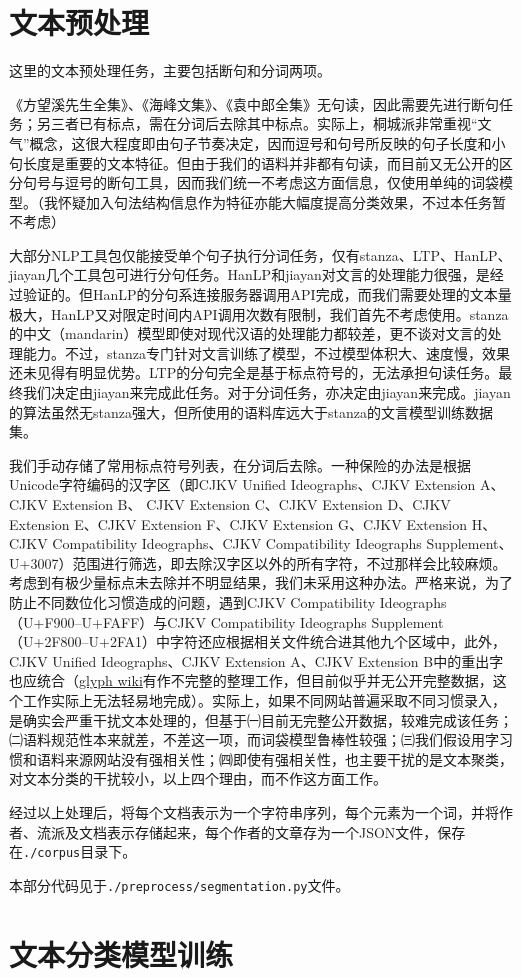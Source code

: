 \documentclass[12pt, a4paper, oneside]{ctexart}
\begin{document}
\section{文本预处理}

这里的文本预处理任务，主要包括断句和分词两项。

《方望溪先生全集》、《海峰文集》、《袁中郎全集》无句读，因此需要先进行断句任务；另三者已有标点，需在分词后去除其中标点。实际上，桐城派非常重视“文气”概念，这很大程度即由句子节奏决定，因而逗号和句号所反映的句子长度和小句长度是重要的文本特征。但由于我们的语料并非都有句读，而目前又无公开的区分句号与逗号的断句工具，因而我们统一不考虑这方面信息，仅使用单纯的词袋模型。（我怀疑加入句法结构信息作为特征亦能大幅度提高分类效果，不过本任务暂不考虑）

大部分NLP工具包仅能接受单个句子执行分词任务，仅有stanza、LTP、HanLP、jiayan几个工具包可进行分句任务。HanLP和jiayan对文言的处理能力很强，是经过验证的。但HanLP的分句系连接服务器调用API完成，而我们需要处理的文本量极大，HanLP又对限定时间内API调用次数有限制，我们首先不考虑使用。stanza的中文（mandarin）模型即使对现代汉语的处理能力都较差，更不谈对文言的处理能力。不过，stanza专门针对文言训练了模型，不过模型体积大、速度慢，效果还未见得有明显优势。LTP的分句完全是基于标点符号的，无法承担句读任务。最终我们决定由jiayan来完成此任务。对于分词任务，亦决定由jiayan来完成。jiayan的算法虽然无stanza强大，但所使用的语料库远大于stanza的文言模型训练数据集。

我们手动存储了常用标点符号列表，在分词后去除。一种保险的办法是根据Unicode字符编码的汉字区（即CJKV Unified Ideographs、CJKV Extension A、CJKV Extension B、
CJKV Extension C、CJKV Extension D、CJKV Extension E、CJKV Extension F、CJKV Extension G、CJKV Extension H、CJKV Compatibility Ideographs、CJKV Compatibility Ideographs Supplement、U+3007）范围进行筛选，即去除汉字区以外的所有字符，不过那样会比较麻烦。考虑到有极少量标点未去除并不明显结果，我们未采用这种办法。严格来说，为了防止不同数位化习惯造成的问题，遇到CJKV Compatibility Ideographs（U+F900–U+FAFF）与CJKV Compatibility Ideographs Supplement（U+2F800–U+2FA1）中字符还应根据相关文件统合进其他九个区域中，此外，CJKV Unified Ideographs、CJKV Extension A、CJKV Extension B中的重出字也应统合（\href{https://glyphwiki.org/wiki/Group:原規格分離}{glyph wiki}有作不完整的整理工作，但目前似乎并无公开完整数据，这个工作实际上无法轻易地完成）。实际上，如果不同网站普遍采取不同习惯录入，是确实会严重干扰文本处理的，但基于㈠目前无完整公开数据，较难完成该任务；㈡语料规范性本来就差，不差这一项，而词袋模型鲁棒性较强；㈢我们假设用字习惯和语料来源网站没有强相关性；㈣即使有强相关性，也主要干扰的是文本聚类，对文本分类的干扰较小，以上四个理由，而不作这方面工作。

经过以上处理后，将每个文档表示为一个字符串序列，每个元素为一个词，并将作者、流派及文档表示存储起来，每个作者的文章存为一个JSON文件，保存在\verb!./corpus!目录下。

本部分代码见于\verb!./preprocess/segmentation.py!文件。

\section{文本分类模型训练}




\end{document}
